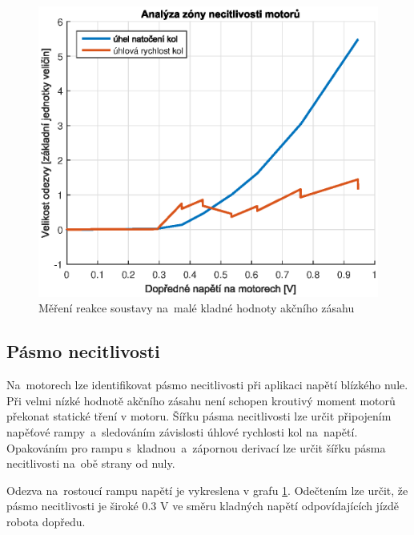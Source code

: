 \documentclass[conference]{IEEEtran}
\begin{document}
\begin{figure}[htbp]
    \centerline{\includegraphics[width=\linewidth]{deadzone_motory_vpred.eps}}
    \caption{Měření reakce soustavy na~malé kladné hodnoty akčního zásahu}
    \label{fig:deadzone_vpred}        
\end{figure}

\subsection{Pásmo necitlivosti}
Na~motorech lze identifikovat pásmo necitlivosti při aplikaci napětí blízkého nule. Při velmi nízké hodnotě
akčního zásahu není schopen kroutivý moment motorů překonat statické tření v motoru.
Šířku pásma necitlivosti lze určit připojením napěťové rampy~a~sledováním závislosti úhlové rychlosti kol na~napětí.
Opakováním pro rampu s~kladnou~a~zápornou derivací lze určit šířku pásma necitlivosti na~obě strany od nuly.

Odezva na~rostoucí rampu napětí je vykreslena v grafu \ref{fig:deadzone_vpred}. Odečtením lze určit,
že pásmo necitlivosti je široké 0.3 \si{V} ve směru kladných napětí odpovídajících jízdě robota dopředu. 
\end{document}
